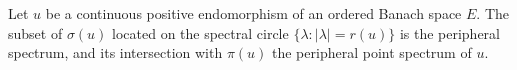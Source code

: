 Let $u$ be a continuous positive endomorphism of an ordered Banach space $E$. The subset of $\sigma(u)$ located on the spectral circle $\{\lambda: |\lambda| = r(u)\}$ is the peripheral spectrum, and its intersection with $\pi(u)$ the peripheral point spectrum of $u$.
